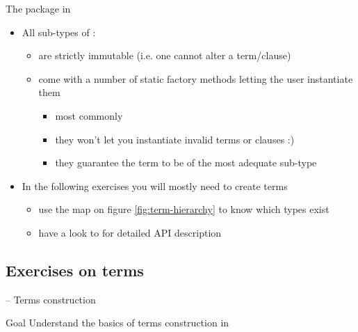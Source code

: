 \documentclass[presentation]{beamer}\mode<presentation>{\usetheme{AMSBolognaFC}}
\begin{document}
\begin{frame}[allowframebreaks]{The  package in }
\begin{itemize}
        \item All sub-types of :
        \begin{itemize}
            \item are strictly \alert{immutable} (i.e. one cannot alter a term/clause)
            \item come with a number of \alert{static factory} methods letting the user instantiate them
            \begin{itemize}
                \item most commonly 
                \item they won't let you instantiate invalid terms or clauses :)
                \item they guarantee the term to be of the \alert{most adequate} sub-type
            \end{itemize}
        \end{itemize}

        \bigskip

        \item In the following exercises you will mostly need to create terms
        \begin{itemize}
            \item use the map on figure \ref{fig:term-hierarchy} to know \alert{which} types exist
            \item have a look to \cite{Ciatto20212pktPresentation} for detailed API description
        \end{itemize}
    \end{itemize}
\end{frame}

\subsection{Exercises on terms}

\startExercise{}

\begin{frame}{\currentExercise{} -- Terms construction}

    \begin{block}{Goal}
        Understand the basics of terms construction in \twopkt{}
    \end{block}
    
\end{frame}

\startExercise{}
\end{document}

